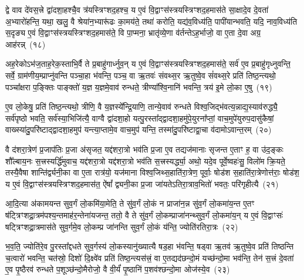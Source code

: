 द्वे वाव दे॑वस॒त्त्रे द्वा॑दशा॒हश्चै॒व त्र॑यस्त्रिꣳशद॒हश्च॒ य ए॒वं वि॒द्वाꣳस॑स्त्रयस्त्रिꣳशद॒हमास॑ते सा॒क्षादे॒व दे॒वता॑ अ॒भ्यारो॑हन्ति॒ यथा॒ खलु॒ वै श्रेया॑न॒भ्यारू॑ढः का॒मय॑ते॒ तथा॑ करोति॒ यद्य॑व॒विध्य॑ति॒ पापी॑यान्भवति॒ यदि॒ नाव॒विध्य॑ति स॒दृङ्य ए॒वं वि॒द्वाꣳस॑स्त्रयस्त्रिꣳशद॒हमास॑ते॒ वि पा॒प्मना॒ भ्रातृ॑व्ये॒णा व॑र्तन्ते\-ऽह॒र्भाजो॒ वा ए॒ता दे॒वा अग्र॒ आह॑रन्न्~(१८)

अह॒रेको\-ऽभ॑ज॒ताह॒रेक॒स्ताभि॒र्वै ते प्र॒बाहु॑गार्ध्नुव॒न् य ए॒वं वि॒द्वाꣳस॑स्त्रयस्त्रिꣳशद॒हमास॑ते॒ सर्व॑ ए॒व प्र॒बाहु॑गृध्नुवन्ति॒ सर्वे॒ ग्राम॑णीय॒म्प्राप्नु॑वन्ति पञ्चा॒हा भ॑वन्ति॒ पञ्च॒ वा ऋ॒तवः॑ संवथ्स॒र ऋ॒तुष्वे॒व सं॑वथ्स॒रे प्रति॑ तिष्ठ॒न्त्यथो॒ पञ्चा᳚क्षरा प॒ङ्क्तिः पाङ्क्तो॑ य॒ज्ञ य॒ज्ञमे॒वाव॑ रुन्धते॒ त्रीण्या᳚श्वि॒नानि॑ भवन्ति॒ त्रय॑ इ॒मे लो॒का ए॒षु~(१९)

ए॒व लो॒केषु॒ प्रति॑ तिष्ठ॒न्त्यथो॒ त्रीणि॒ वै य॒ज्ञस्ये᳚न्द्रि॒याणि॒ तान्ये॒वाव॑ रुन्धते विश्व॒जिद्भ॑वत्य॒न्नाद्य॒स्याव॑रुद्ध्यै॒ सर्व॑पृष्ठो भवति॒ सर्व॑स्या॒भिजि॑त्यै॒ वाग्वै द्वा॑दशा॒हो यत्पु॒रस्ता᳚द्द्वादशा॒हमु॑पे॒युरना᳚प्तां॒ वाच॒मुपे॑युरुप॒दासु॑कैषां॒ वाख्स्या॑दु॒परि॑ष्टाद्द्वादशा॒हमुप॑ यन्त्या॒प्तामे॒व वाच॒मुप॑ यन्ति॒ तस्मा॑दु॒परि॑ष्टाद्वा॒चा व॑दामो\-ऽवान्त॒रम्~(२०)

वै द॑शरा॒त्रेण॑ प्र॒जाप॑तिः प्र॒जा अ॑सृजत॒ यद्द॑शरा॒त्रो भव॑ति प्र॒जा ए॒व तद्यज॑मानाः सृजन्त ए॒ताꣳ ह॒ वा उ॑द॒ङ्कः शौ᳚ल्बाय॒नः स॒त्त्रस्यर्द्धि॑मुवाच॒ यद्द॑शरा॒त्रो यद्द॑शरा॒त्रो भव॑ति स॒त्त्रस्यर्द्ध्या॒ अथो॒ यदे॒व पूर्वे॒ष्वहः॑सु॒ विलो॑म क्रि॒यते॒ तस्यै॒वैषा शान्ति॑र्द्व्यनी॒का वा ए॒ता रात्र॑यो॒ यज॑माना विश्व॒जिथ्स॒हाति॑रा॒त्रेण॒ पूर्वाः॒ षोड॑श स॒हाति॑रा॒त्रेणोत्त॑राः॒ षोड॑श॒ य ए॒वं वि॒द्वाꣳस॑स्त्रयस्त्रिꣳशद॒हमास॑त॒ ऐ॑षां᳚ द्व्यनी॒का प्र॒जा जा॑यते\-ऽतिरा॒त्राव॒भितो॑ भवतः॒ परि॑गृहीत्यै~(२१)

{\anuvakamend[{अ॒ह॒र॒न्ने॒ष्व॑वान्त॒रꣳ षोड॑श स॒ह स॒प्तद॑श च}]}%

आ॒दि॒त्या अ॑कामयन्त सुव॒र्गं लो॒कमि॑या॒मेति॒ ते सु॑व॒र्गं लो॒कं न प्राजा॑न॒न्न सु॑व॒र्गं लो॒कमा॑य॒न्त ए॒तꣳ ष॑ट्त्रिꣳशद्रा॒त्रम॑पश्य॒न्तमाह॑र॒न्तेना॑यजन्त॒ ततो॒ वै ते सु॑व॒र्गं लो॒कम्प्राजा॑नन्थ्सुव॒र्गं लो॒कमा॑य॒न् य ए॒वं वि॒द्वाꣳसः॑ षट्त्रिꣳशद्रा॒त्रमास॑ते सुव॒र्गमे॒व लो॒कम्प्र जा॑नन्ति सुव॒र्गं लो॒कं य॑न्ति॒ ज्योति॑रतिरा॒त्रः~(२२)

भ॒व॒ति॒ ज्योति॑रे॒व पु॒रस्ता᳚द्दधते सुव॒र्गस्य॑ लो॒कस्यानु॑ख्यात्यै षड॒हा भ॑वन्ति॒ षड्वा ऋ॒तव॑ ऋ॒तुष्वे॒व प्रति॑ तिष्ठन्ति च॒त्वारो॑ भवन्ति॒ चत॑स्रो॒ दिशो॑ दि॒क्ष्वे॑व प्रति॑ तिष्ठ॒न्त्यस॑त्त्रं॒ वा ए॒तद्यद॑छन्दो॒मं यच्छ॑न्दो॒मा भव॑न्ति॒ तेन॑ स॒त्त्रं दे॒वता॑ ए॒व पृ॒ष्ठैरव॑ रुन्धते प॒शूञ्छ॑न्दो॒मैरोजो॒ वै वी॒र्यं॑ पृ॒ष्ठानि॑ प॒शव॑श्छन्दो॒मा ओज॑स्ये॒व~(२३)

